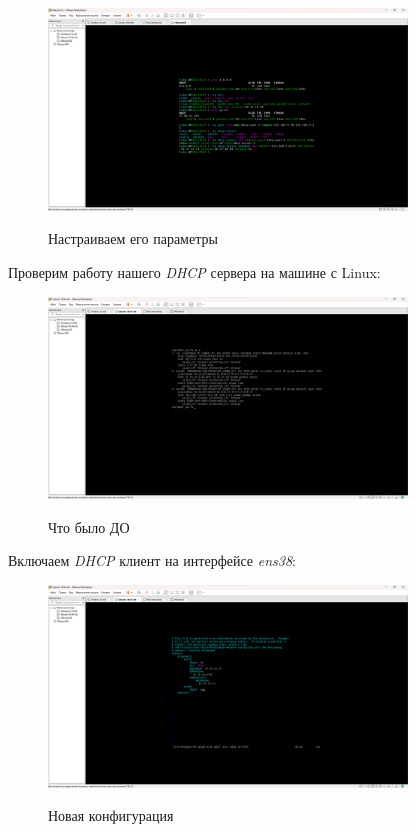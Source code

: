 \documentclass[a4paper]{article}
\begin{document}
  \begin{figure}[H]
    \centering
    \includegraphics[width=0.85\textwidth]{06_00 (102)}
    \label{img:102}
    \caption{Настраиваем его параметры}
  \end{figure}

  Проверим работу нашего \textit{DHCP} сервера на машине с Linux:
  
  \begin{figure}[H]
    \centering
    \includegraphics[width=0.85\textwidth]{06_00 (103)}
    \label{img:103}
    \caption{Что было ДО}
  \end{figure}

  Включаем \textit{DHCP} клиент на интерфейсе \textit{ens38}:
  
  \begin{figure}[H]
    \centering
    \includegraphics[width=0.85\textwidth]{06_00 (104)}
    \label{img:104}
    \caption{Новая конфигурация}
  \end{figure}
  
\end{document}
